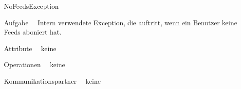 \begin{class}{30}{NoFeedsException}
\item[Aufgabe]~\
Intern verwendete Exception, die auftritt, wenn ein Benutzer keine Feeds aboniert hat.
\item[Attribute]~\ keine
\item[Operationen]~\ keine
\item[Kommunikationspartner]~\ keine
\end{class}
